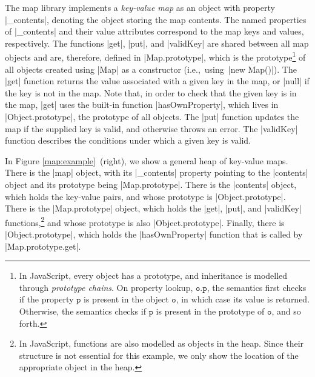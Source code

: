The map library implements a \emph{key-value map} as an object with property \jsinline|_contents|, denoting the object storing the map contents.  
The named properties of \jsinline|_contents| and their value attributes correspond to the map keys and values, respectively.
The functions \jsinline|get|, \jsinline|put|, and \jsinline|validKey| are shared between all map 
objects and are, therefore, defined in \jsinline|Map.prototype|, which is the prototype\footnote{In JavaScript, every object has a prototype, and inheritance is modelled through \emph{prototype chains}. On property lookup, $\mathtt{o.p}$, the semantics first checks if the property $\mathtt{p}$ is present in the object $\mathtt{o}$, in which case its value is returned. Otherwise, the semantics checks if $\mathtt{p}$ is present in the prototype of $\mathtt{o}$, and so  forth.} of all objects created using \jsinline|Map| as a constructor (i.e.,~using~\jsinline|new Map()|). 
The \jsinline|get| function returns the value associated with a given key in the map, or \jsinline|null| if the key is not in the map. 
Note that, in order to check that the given key is in the map, \jsinline|get| uses the built-in function \jsinline|hasOwnProperty|, which lives in \jsinline|Object.prototype|, the prototype of all objects.
The \jsinline|put| function updates the map if the supplied key is valid, and otherwise throws an error. 
The \jsinline|validKey| function describes the conditions under which a given key is valid.

In Figure \ref{map:example}~(right), we show a general heap of key-value maps. There is the \jsinline|map| object, with its \jsinline|_contents| property pointing to the \jsinline|contents| object and its prototype being \jsinline|Map.prototype|. There is the \jsinline|contents| object, which holds the key-value pairs, and whose prototype is \jsinline|Object.prototype|. There is the \jsinline|Map.prototype| object, which holds the \jsinline|get|, \jsinline|put|, and \jsinline|validKey| functions,\footnote{In JavaScript, functions are also modelled as objects in the heap. Since their structure is not essential for this example, we only show the location of the appropriate object in the heap.} and whose prototype is also \jsinline|Object.prototype|. Finally, there is \jsinline|Object.prototype|, which holds the \jsinline|hasOwnProperty| function that is called by \jsinline|Map.prototype.get|.


